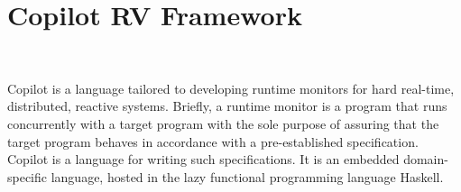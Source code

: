 \section{Copilot RV Framework}~\label{sec:Copilot}


Copilot is a language tailored to developing runtime monitors for hard
real-time, distributed, reactive systems. Briefly, a runtime monitor is a
program that runs concurrently with a target program with the sole purpose of
assuring that the target program behaves in accordance with a pre-established
specification\citep{monitors}. Copilot is a language for writing such
specifications\citep{copilot, pike-icfp-12, pike-isse-13}. It is an embedded
domain-specific language, hosted in the lazy functional programming language
Haskell.

